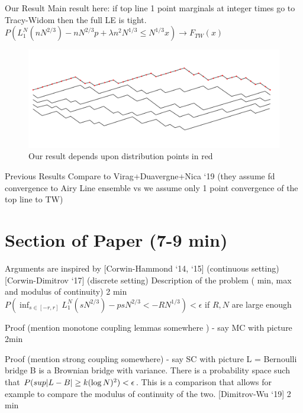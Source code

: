 \documentclass[9pt,t]{beamer}
\DeclarePairedDelimiter\abs{\lvert}{\rvert}
\begin{document}
\begin{frame}{Our Result}
Main result here: if top line 1 point marginals at integer times go to Tracy-Widom then the full LE is tight. 
$P(L_1^N(nN^{2/3}) - nN^{2/3} p + \lambda n^2 N^{1/3} \leq N^{1/3} x) \to F_{TW}(x)$
\begin{figure}
	\includegraphics[width=\textwidth]{graphics/ConvToTW.jpg}
	\caption{Our result depends upon distribution points in red}
\end{figure}
\end{frame}

\begin{frame}{Previous Results}
Compare to Virag+Duavergne+Nica ‘19 (they assume fd convergence to Airy Line ensemble vs we assume only 1 point convergence of the top line to TW)
\end{frame}


\section{Section of Paper (7-9 min)}

\begin{frame}
Arguments are inspired by [Corwin-Hammond ‘14, ‘15] (continuous setting) [Corwin-Dimitrov ‘17] (discrete setting) Description of the problem ( min, max and modulus of continuity)
2 min   $P( \inf_{s\in[-r, r]} L_1^N(sN^{2/3}) - psN^{2/3}  < -RN^{1/3} ) < \epsilon$ if $R,N$ are large enough  
\end{frame}

\begin{frame}
Proof  (mention monotone coupling lemmas somewhere ) - say MC with picture
2min
\end{frame}

\begin{frame}
Proof  (mention strong coupling somewhere) - say SC with picture 
L = Bernoulli bridge B is a Brownian bridge with variance. There is a probability space such that $P( sup \abs*{L - B} \geq k (\log N)^2) < \epsilon$. This is a comparison that allows for example to compare the modulus of continuity of the two. [Dimitrov-Wu ‘19]
2 min
\end{frame}
\end{document}
